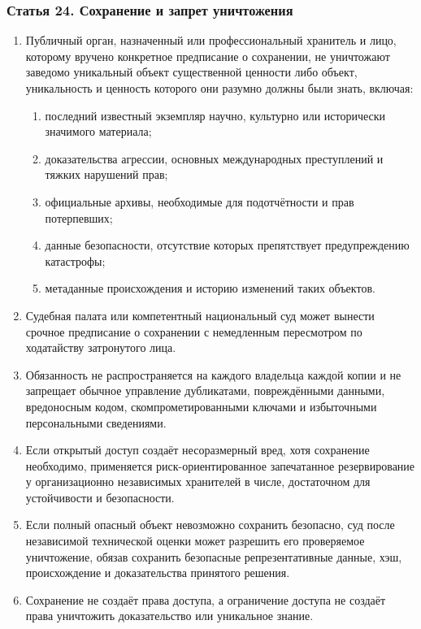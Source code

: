 \documentclass[
  russian,
  11pt,
  a4paper,
]{article}
\providecommand{\tightlist}{%
  \setlength{\itemsep}{0pt}\setlength{\parskip}{0pt}}
\begin{document}
\subsubsection{Статья 24. Сохранение и запрет
уничтожения}\label{ux441ux442ux430ux442ux44cux44f-24-ux441ux43eux445ux440ux430ux43dux435ux43dux438ux435-ux438-ux437ux430ux43fux440ux435ux442-ux443ux43dux438ux447ux442ux43eux436ux435ux43dux438ux44f}

\begin{enumerate}
\def\labelenumi{\arabic{enumi}.}
\tightlist
\item
  Публичный орган, назначенный или профессиональный хранитель и лицо,
  которому вручено конкретное предписание о сохранении, не уничтожают
  заведомо уникальный объект существенной ценности либо объект,
  уникальность и ценность которого они разумно должны были знать,
  включая:

  \begin{enumerate}
  \def\labelenumii{\arabic{enumii}.}
  \tightlist
  \item
    последний известный экземпляр научно, культурно или исторически
    значимого материала;
  \item
    доказательства агрессии, основных международных преступлений и
    тяжких нарушений прав;
  \item
    официальные архивы, необходимые для подотчётности и прав
    потерпевших;
  \item
    данные безопасности, отсутствие которых препятствует предупреждению
    катастрофы;
  \item
    метаданные происхождения и историю изменений таких объектов.
  \end{enumerate}
\item
  Судебная палата или компетентный национальный суд может вынести
  срочное предписание о сохранении с немедленным пересмотром по
  ходатайству затронутого лица.
\item
  Обязанность не распространяется на каждого владельца каждой копии и не
  запрещает обычное управление дубликатами, повреждёнными данными,
  вредоносным кодом, скомпрометированными ключами и избыточными
  персональными сведениями.
\item
  Если открытый доступ создаёт несоразмерный вред, хотя сохранение
  необходимо, применяется риск-ориентированное запечатанное
  резервирование у организационно независимых хранителей в числе,
  достаточном для устойчивости и безопасности.
\item
  Если полный опасный объект невозможно сохранить безопасно, суд после
  независимой технической оценки может разрешить его проверяемое
  уничтожение, обязав сохранить безопасные репрезентативные данные, хэш,
  происхождение и доказательства принятого решения.
\item
  Сохранение не создаёт права доступа, а ограничение доступа не создаёт
  права уничтожить доказательство или уникальное знание.
\end{enumerate}
\end{document}

